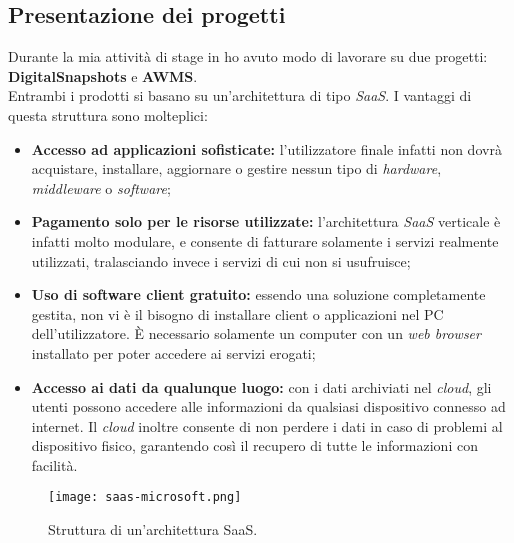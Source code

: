 \subsection{Presentazione dei progetti}
Durante la mia attività di stage in \AD{} ho avuto modo di lavorare su due progetti: \textbf{DigitalSnapshots} e \textbf{AWMS}.\\
Entrambi i prodotti si basano su un'architettura di tipo \textit{SaaS}.
I vantaggi di questa struttura sono molteplici: 
\begin{itemize}
\item \textbf{Accesso ad applicazioni sofisticate:} l'utilizzatore finale infatti non dovrà acquistare, installare, aggiornare o gestire nessun tipo di \textit{hardware}, \textit{middleware} o \textit{software};
\item \textbf{Pagamento solo per le risorse utilizzate:} l'architettura \textit{SaaS} verticale è infatti molto modulare, e consente di fatturare solamente i servizi realmente utilizzati, tralasciando invece i servizi di cui non si usufruisce;
\item \textbf{Uso di software client gratuito:} essendo una soluzione completamente gestita, non vi è il bisogno di installare client o applicazioni nel PC dell'utilizzatore. \`E necessario solamente un computer con un \textit{web browser} installato per poter accedere ai servizi erogati;
\item \textbf{Accesso ai dati da qualunque luogo:} con i dati archiviati nel \textit{cloud}, gli utenti possono accedere alle informazioni da qualsiasi dispositivo connesso ad internet. Il \textit{cloud} inoltre consente di non perdere i dati in caso di problemi al dispositivo fisico, garantendo così il recupero di tutte le informazioni con facilità.
\end{itemize}

\begin{figure}[h]
\texttt{[image: saas-microsoft.png]}
\centering
\caption{Struttura di un'architettura SaaS.} 
\label{fig:saas-microsoft}
\end{figure}

